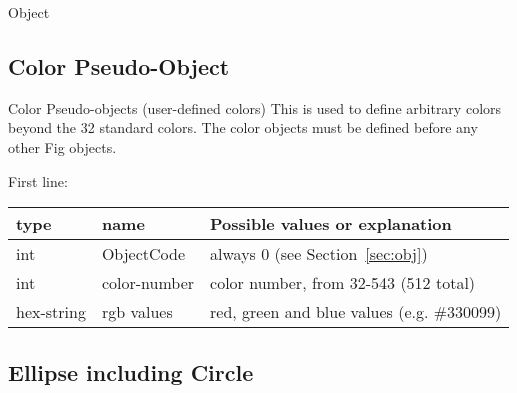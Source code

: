 \documentclass[10pt, a4paper]{article}
\begin{document}
Object

\setcounter{subsection}{-1}
\subsection{Color Pseudo-Object}\label{subsec:colorPseudoObj}

Color Pseudo-objects (user-defined colors)
          This is used to define arbitrary colors beyond the 32 standard colors.
          The color objects must be defined before any other Fig objects.


    First line:

\begin{tabular}{|lll|}
\hline
type & name & Possible values or explanation \\
\hline
\hline
int        & ObjectCode    & always 0 (see Section~\ref{sec:obj}) \\
int        & color-number  & color number, from 32-543 (512 total)\\
hex-string & rgb values    & red, green and blue values (e.g. \#330099) \\
\hline
\end{tabular}


\subsection{Ellipse including Circle}\label{subsec:ellipse}
\end{document}
